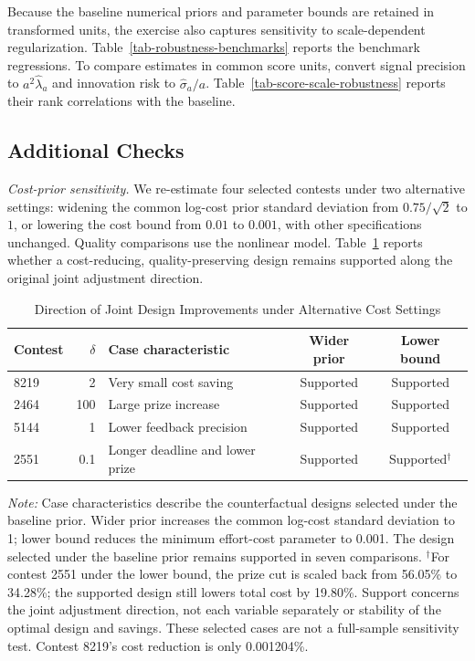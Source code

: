 \documentclass[mnsc]{informs3}
\begin{document}
\begin{APPENDICES}
Because the baseline numerical priors and parameter bounds are retained in transformed units, the exercise also captures sensitivity to scale-dependent regularization. Table~\ref{tab-robustness-benchmarks} reports the benchmark regressions.
To compare estimates in common score units, convert signal precision to $a^2\hat\lambda_a$ and innovation risk to $\hat\sigma_a/a$. Table~\ref{tab-score-scale-robustness} reports their rank correlations with the baseline.




\clearpage
\subsection{Additional Checks}\label{app-additional-checks}

\textit{Cost-prior sensitivity.} We re-estimate four selected contests under two alternative settings: widening the common log-cost prior standard deviation from $0.75/\sqrt{2}$ to $1$, or lowering the cost bound from $0.01$ to $0.001$, with other specifications unchanged. Quality comparisons use the nonlinear model. Table~\ref{tab-cost-prior-direction} reports whether a cost-reducing, quality-preserving design remains supported along the original joint adjustment direction.

\begin{table}[!htbp]
\centering
\caption{Direction of Joint Design Improvements under Alternative Cost Settings}
\label{tab-cost-prior-direction}
\small
\begin{tabularx}{\textwidth}{lr>{\raggedright\arraybackslash}Xcc}
\toprule
Contest & $\delta$ & Case characteristic & Wider prior & Lower bound\\
\midrule
8219 & 2 & Very small cost saving & Supported & Supported\\
2464 & 100 & Large prize increase & Supported & Supported\\
5144 & 1 & Lower feedback precision & Supported & Supported\\
2551 & 0.1 & Longer deadline and lower prize & Supported & Supported$^{\dagger}$\\
\bottomrule
\end{tabularx}
\par\vspace{0.5ex}
\begin{minipage}{\textwidth}
\footnotesize\textit{Note:} Case characteristics describe the counterfactual designs selected under the baseline prior. Wider prior increases the common log-cost standard deviation to 1; lower bound reduces the minimum effort-cost parameter to 0.001. The design selected under the baseline prior remains supported in seven comparisons. $^{\dagger}$For contest 2551 under the lower bound, the prize cut is scaled back from 56.05\% to 34.28\%; the supported design still lowers total cost by 19.80\%. Support concerns the joint adjustment direction, not each variable separately or stability of the optimal design and savings. These selected cases are not a full-sample sensitivity test. Contest 8219's cost reduction is only 0.001204\%.
\end{minipage}
\end{table}


\end{APPENDICES}
\end{document}
